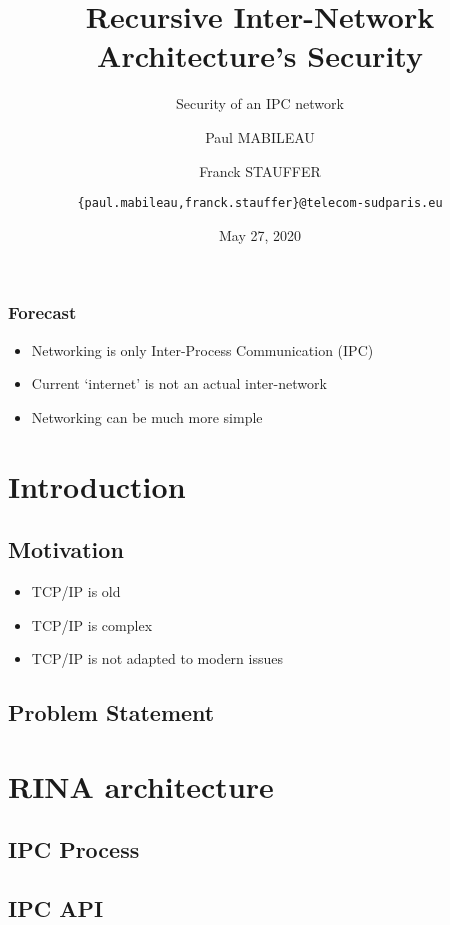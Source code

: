 \documentclass[aspectratio=169]{beamer}
\author[MABILEAU, STAUFFER]{Paul MABILEAU
\and
Franck STAUFFER
\and 
\texttt{\{paul.mabileau,franck.stauffer\}@telecom-sudparis.eu}}
\institute[TSP]{TELECOM SudParis}
\title[RINA's security]{Recursive Inter-Network Architecture's Security}
\subtitle{Security of an IPC network}
\date[2020/05/27]{May 27, 2020}
\begin{document}
\maketitle

\begin{frame}
    \frametitle{Forecast}
    \begin{itemize}
        \item Networking is only Inter-Process Communication (IPC)
        \item Current `internet' is not an actual inter-network
        \item Networking can be much more simple
    \end{itemize}
\end{frame}


\section{Introduction}

\subsection{Motivation}
\begin{frame}
    \begin{itemize}
        \item TCP/IP is old
        \item TCP/IP is complex
        \item TCP/IP is not adapted to modern issues
    \end{itemize}
\end{frame}

\subsection{Problem Statement}

\section{RINA architecture}
\subsection{IPC Process}
\subsection{IPC API}
\end{document}
